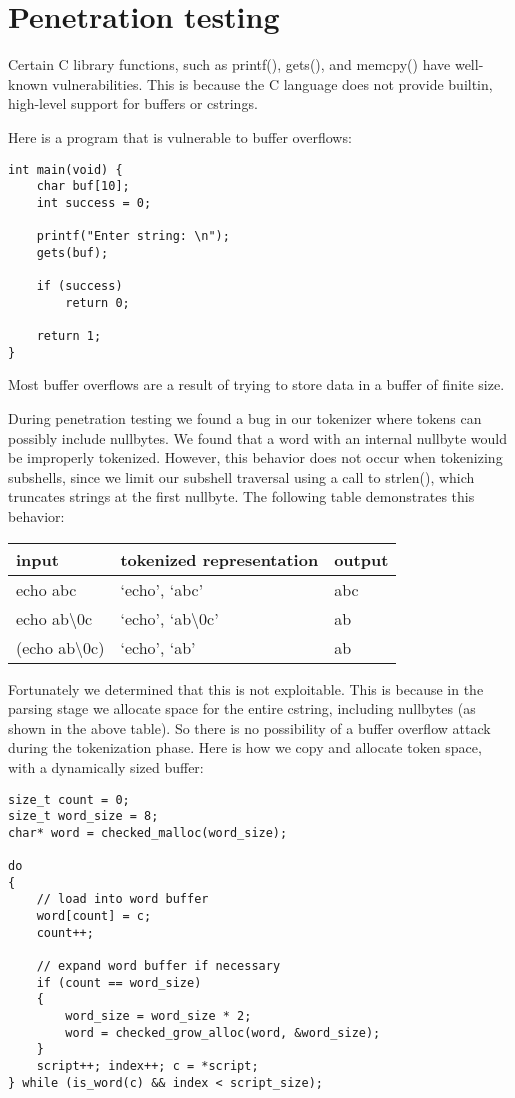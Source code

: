 \documentclass[12pt]{article}
\begin{document}
\section{Penetration testing}
Certain C library functions, such as printf(), gets(), and memcpy() have well-known vulnerabilities\cite{formatstring,smashingthestack}. This is because the C language does not provide builtin, high-level support for buffers or cstrings. 

Here is a program that is vulnerable to buffer overflows:
\begin{lstlisting}[frame=single]
int main(void) {
    char buf[10];
    int success = 0;
    
    printf("Enter string: \n");
    gets(buf);

    if (success)
        return 0;

    return 1;
}
\end{lstlisting}

Most buffer overflows are a result of trying to store data in a buffer of finite size.

During penetration testing we found a bug in our tokenizer where tokens can possibly include nullbytes. We found that a word with an internal nullbyte would be improperly tokenized. However, this behavior does not occur when tokenizing subshells, since we limit our subshell traversal using a call to strlen(), which truncates strings at the first nullbyte. The following table demonstrates this behavior:

  \begin{tabular}{ | l | l | l | }
    \hline
    input & tokenized representation & output \\ \hline
    echo abc & `echo', `abc' & abc \\ \hline
    echo ab\textbackslash0c & `echo', `ab\textbackslash0c' & ab \\ \hline
    (echo ab\textbackslash0c) & `echo', `ab' & ab \\
    \hline
  \end{tabular}

Fortunately we determined that this is not exploitable. This is because in the parsing stage we allocate space for the entire cstring, including nullbytes (as shown in the above table). So there is no possibility of a buffer overflow attack during the tokenization phase. Here is how we copy and allocate token space, with a dynamically sized buffer:

\begin{lstlisting}[frame=single]
size_t count = 0;
size_t word_size = 8;
char* word = checked_malloc(word_size);

do
{
    // load into word buffer
    word[count] = c;
    count++;

    // expand word buffer if necessary
    if (count == word_size)
    {
        word_size = word_size * 2;
        word = checked_grow_alloc(word, &word_size);
    }
    script++; index++; c = *script;
} while (is_word(c) && index < script_size);
\end{lstlisting}
\end{document}
